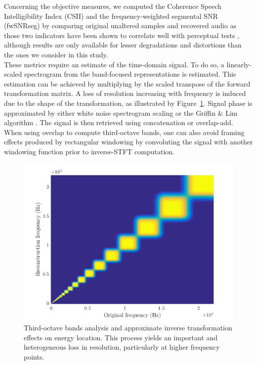 \documentclass[final,3p,times,twocolumn]{elsarticle}
\begin{document}
Concerning the objective measures, we computed the Coherence Speech Intelligibility Index \cite{kates2005} (CSII) and the frequency-weighted segmental SNR \cite{hu2008} (fwSNRseg) by comparing original unaltered samples and recovered audio as those two indicators have been shown to correlate well with perceptual tests \cite{ma2009}, although results are only available for lesser degradations and distortions than the ones we consider in this study. \\

These metrics require an estimate of the time-domain signal. To do so, a linearly-scaled spectrogram from the band-focused representations is estimated. This estimation can be achieved by multiplying by the scaled transpose of the forward transformation matrix. A loss of resolution increasing with frequency is induced due to the shape of the transformation, as illustrated by Figure~\ref{fig:freq}. Signal phase is approximated by either white noise spectrogram scaling or the Griffin \& Lim algorithm \cite{griffin1984}. The signal is then retrieved using concatenation or overlap-add. When using overlap to compute third-octave bands, one can also avoid framing effects produced by rectangular windowing by convoluting the signal with another windowing function prior to inverse-STFT computation.\\

\begin{figure}[htbp]
	\centering
		\includegraphics[width=\columnwidth]{figures/freq.png}
	\caption{Third-octave bands analysis and approximate inverse transformation effects on energy location. This process yields an important and heterogeneous loss in resolution, particularly at higher frequency points.}
	\label{fig:freq}
\end{figure}
\end{document}
